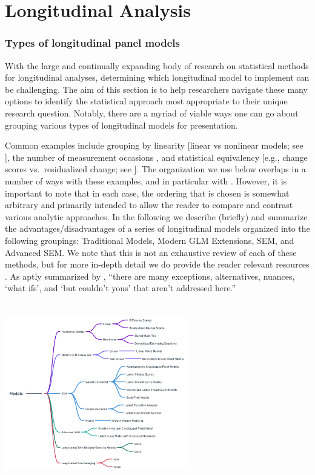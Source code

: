 \documentclass[
  number,
  preprint,
  3p,
  twocolumn]{elsarticle}
\begin{document}
\hypertarget{longitudinal-analysis}{%
\section{Longitudinal Analysis}\label{longitudinal-analysis}}

\label{sec:headings}

\hypertarget{types-of-longitudinal-panel-models}{%
\subsubsection{Types of longitudinal panel
models}\label{types-of-longitudinal-panel-models}}

With the large and continually expanding body of research on statistical
methods for longitudinal analyses, determining which longitudinal model
to implement can be challenging. The aim of this section is to help
researchers navigate these many options to identify the statistical
approach most appropriate to their unique research question. Notably,
there are a myriad of viable ways one can go about grouping various
types of longitudinal models for presentation.

Common examples include grouping by linearity {[}linear vs nonlinear
models; see \citep{collins2006}{]}, the number of measurement occasions
\citep[see][]{king2018}, and statistical equivalency {[}e.g., change
scores vs.~residualized change; see \citep{castro-schilo2018}{]}. The
organization we use below overlaps in a number of ways with these
examples, and in particular with \citep{bauer2019}. However, it is
important to note that in each case, the ordering that is chosen is
somewhat arbitrary and primarily intended to allow the reader to compare
and contrast various analytic approaches. In the following we describe
(briefly) and summarize the advantages/disadvantages of a series of
longitudinal models organized into the following groupings: Traditional
Models, Modern GLM Extensions, SEM, and Advanced SEM. We note that this
is not an exhaustive review of each of these methods, but for more
in-depth detail we do provide the reader relevant resources
\citep[e.g.,][]{curran2021}. As aptly summarized by \citep{bauer2019},
``there are many exceptions, alternatives, nuances, `what ifs', and `but
couldn't yous' that aren't addressed here.''

\includegraphics[width=3.125in,height=3.125in]{./figures/Mindmap1copy.png}
\end{document}
